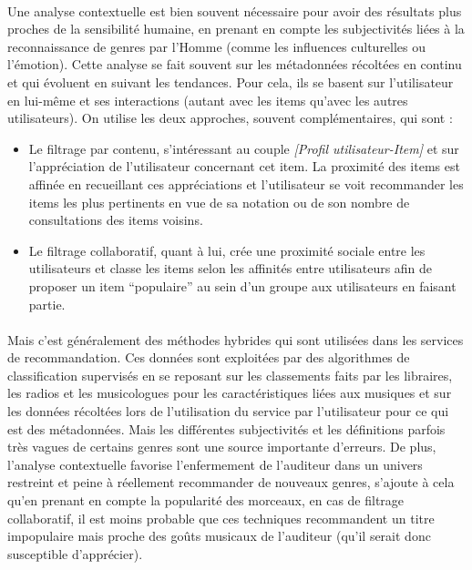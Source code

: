 \documentclass[soumission]{ir}
\begin{document}
\paragraph{}
Une analyse contextuelle est bien souvent nécessaire pour avoir des résultats plus proches de la sensibilité 
humaine, en prenant en compte les subjectivités liées à la reconnaissance de genres par l’Homme (comme les 
influences culturelles ou l’émotion). Cette analyse se fait souvent sur les métadonnées récoltées en continu 
et qui évoluent en suivant les tendances. Pour cela, ils se basent sur l’utilisateur en lui-même et ses 
interactions (autant avec les items qu’avec les autres utilisateurs). On utilise les deux approches, souvent 
complémentaires, qui sont : 
\begin{itemize}
    \item{Le filtrage par contenu, s'intéressant au couple \textit{[Profil utilisateur-Item]} et sur l’appréciation 
    de l’utilisateur concernant cet item. La proximité des items est affinée en recueillant ces appréciations 
    et l’utilisateur se voit recommander les items les plus pertinents en vue de sa notation ou de son 
    nombre de consultations des items voisins.}
    \\
    \item{Le filtrage collaboratif, quant à lui, crée une proximité sociale entre les utilisateurs et classe 
    les items selon les affinités entre utilisateurs afin de proposer un item “populaire” au sein d’un 
    groupe aux utilisateurs en faisant partie.}
\end{itemize}

\paragraph{}
Mais c’est généralement des méthodes hybrides qui sont utilisées dans les services de recommandation. Ces 
données sont exploitées par des algorithmes de classification supervisés en se reposant sur les classements 
faits par les libraires, les radios et les musicologues pour les caractéristiques liées aux musiques et sur 
les données récoltées lors de l’utilisation du service par l’utilisateur pour ce qui est des métadonnées. 
Mais les différentes subjectivités et les définitions parfois très vagues de certains genres sont une source 
importante d’erreurs. De plus, l’analyse contextuelle favorise l’enfermement de l’auditeur dans un univers 
restreint et peine à réellement recommander de nouveaux genres, s’ajoute à cela qu’en prenant en compte la 
popularité des morceaux, en cas de filtrage collaboratif, il est moins probable que ces techniques 
recommandent un titre impopulaire mais proche des goûts musicaux de l’auditeur (qu’il serait donc 
susceptible d'apprécier).
\end{document}
